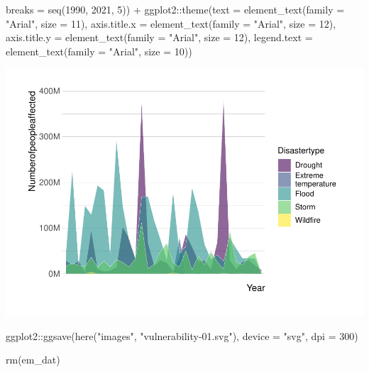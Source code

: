 \documentclass[
  12pt,
]{article}
\newenvironment{Shaded}{}{}
\newcommand{\AttributeTok}[1]{\textcolor[rgb]{0.49,0.56,0.16}{#1}}
\newcommand{\DecValTok}[1]{\textcolor[rgb]{0.25,0.63,0.44}{#1}}
\newcommand{\FunctionTok}[1]{\textcolor[rgb]{0.02,0.16,0.49}{#1}}
\newcommand{\NormalTok}[1]{#1}
\newcommand{\SpecialCharTok}[1]{\textcolor[rgb]{0.25,0.44,0.63}{#1}}
\newcommand{\StringTok}[1]{\textcolor[rgb]{0.25,0.44,0.63}{#1}}
\begin{document}
\begin{Shaded}
\begin{Highlighting}[]
        \AttributeTok{breaks =} \FunctionTok{seq}\NormalTok{(}\DecValTok{1990}\NormalTok{, }\DecValTok{2021}\NormalTok{, }\DecValTok{5}\NormalTok{)) }\SpecialCharTok{+}\NormalTok{ ggplot2}\SpecialCharTok{::}\FunctionTok{theme}\NormalTok{(}\AttributeTok{text =} \FunctionTok{element\_text}\NormalTok{(}\AttributeTok{family =} \StringTok{"Arial"}\NormalTok{, }
    \AttributeTok{size =} \DecValTok{11}\NormalTok{), }\AttributeTok{axis.title.x =} \FunctionTok{element\_text}\NormalTok{(}\AttributeTok{family =} \StringTok{"Arial"}\NormalTok{, }
    \AttributeTok{size =} \DecValTok{12}\NormalTok{), }\AttributeTok{axis.title.y =} \FunctionTok{element\_text}\NormalTok{(}\AttributeTok{family =} \StringTok{"Arial"}\NormalTok{, }
    \AttributeTok{size =} \DecValTok{12}\NormalTok{), }\AttributeTok{legend.text =} \FunctionTok{element\_text}\NormalTok{(}\AttributeTok{family =} \StringTok{"Arial"}\NormalTok{, }
    \AttributeTok{size =} \DecValTok{10}\NormalTok{))}
\end{Highlighting}
\end{Shaded}

\includegraphics{em-dat-visualizations_files/figure-latex/plot disasters over time-1}

\begin{Shaded}
\begin{Highlighting}[]

\NormalTok{ggplot2}\SpecialCharTok{::}\FunctionTok{ggsave}\NormalTok{(}\FunctionTok{here}\NormalTok{(}\StringTok{"images"}\NormalTok{, }\StringTok{"vulnerability{-}01.svg"}\NormalTok{), }
    \AttributeTok{device =} \StringTok{"svg"}\NormalTok{, }\AttributeTok{dpi =} \DecValTok{300}\NormalTok{)}

\FunctionTok{rm}\NormalTok{(em\_dat)}
\end{Highlighting}
\end{Shaded}
\end{document}
